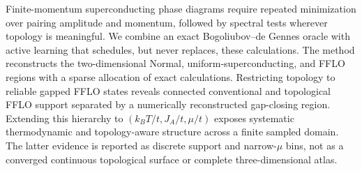 Finite-momentum superconducting phase diagrams require repeated minimization over pairing amplitude and momentum, followed by spectral tests wherever topology is meaningful.  We combine an exact Bogoliubov--de Gennes oracle with active learning that schedules, but never replaces, these calculations.  The method reconstructs the two-dimensional Normal, uniform-superconducting, and FFLO regions with a sparse allocation of exact calculations.  Restricting topology to reliable gapped FFLO states reveals connected conventional and topological FFLO support separated by a numerically reconstructed gap-closing region.  Extending this hierarchy to $(k_BT/t,J_A/t,\mu/t)$ exposes systematic thermodynamic and topology-aware structure across a finite sampled domain.  The latter evidence is reported as discrete support and narrow-$\mu$ bins, not as a converged continuous topological surface or complete three-dimensional atlas.
